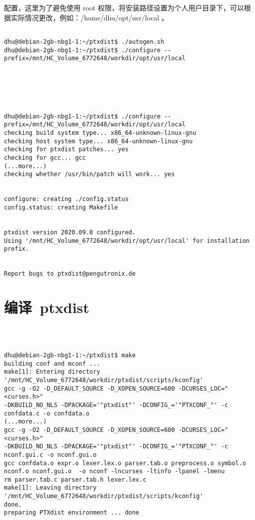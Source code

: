 配置，这里为了避免使用 root 权限，将安装路径设置为个人用户目录下，可以根据实际情况更改，例如：/home/dhu/opt/usr/local 。

\begin{lstlisting}

dhu@debian-2gb-nbg1-1:~/ptxdist$ ./autogen.sh
dhu@debian-2gb-nbg1-1:~/ptxdist$ ./configure --prefix=/mnt/HC_Volume_6772648/workdir/opt/usr/local






dhu@debian-2gb-nbg1-1:~/ptxdist$ ./configure --prefix=/mnt/HC_Volume_6772648/workdir/opt/usr/local                                                            
checking build system type... x86_64-unknown-linux-gnu
checking host system type... x86_64-unknown-linux-gnu
checking for ptxdist patches... yes                                                                                                                           
checking for gcc... gcc
(...more...)
checking whether /usr/bin/patch will work... yes                           


configure: creating ./config.status
config.status: creating Makefile


ptxdist version 2020.09.0 configured.
Using '/mnt/HC_Volume_6772648/workdir/opt/usr/local' for installation prefix.


Report bugs to ptxdist@pengutronix.de

\end{lstlisting}


\section{编译~ptxdist}

\begin{lstlisting}
  


dhu@debian-2gb-nbg1-1:~/ptxdist$ make
building conf and mconf ...                                               
make[1]: Entering directory '/mnt/HC_Volume_6772648/workdir/ptxdist/scripts/kconfig'                        
gcc -g -O2 -D_DEFAULT_SOURCE -D_XOPEN_SOURCE=600 -DCURSES_LOC="<curses.h>"
-DKBUILD_NO_NLS -DPACKAGE='"ptxdist"' -DCONFIG_='"PTXCONF_"' -c confdata.c -o confdata.o                   
(...more...)
gcc -g -O2 -D_DEFAULT_SOURCE -D_XOPEN_SOURCE=600 -DCURSES_LOC="<curses.h>"
-DKBUILD_NO_NLS -DPACKAGE='"ptxdist"' -DCONFIG_='"PTXCONF_"' -c nconf.gui.c -o nconf.gui.o
gcc confdata.o expr.o lexer.lex.o parser.tab.o preprocess.o symbol.o nconf.o nconf.gui.o  -o nconf -lncurses -ltinfo -lpanel -lmenu                  
rm parser.tab.c parser.tab.h lexer.lex.c                                  
make[1]: Leaving directory '/mnt/HC_Volume_6772648/workdir/ptxdist/scripts/kconfig'
done.
preparing PTXdist environment ... done

\end{lstlisting}

